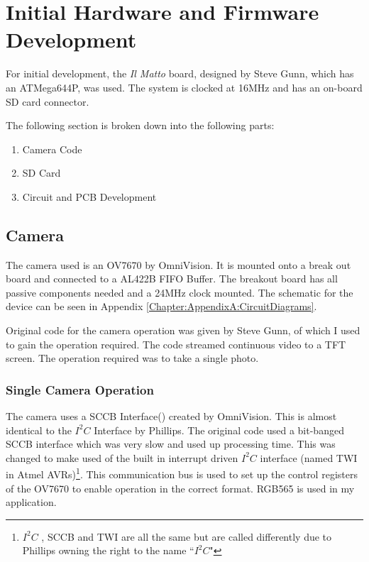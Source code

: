 \chapter{Initial Hardware and Firmware Development} \label{Chapter:HardwareDevelopment}
For initial development, the \textit{Il Matto} board, designed by Steve Gunn, which has an ATMega644P, was used. The system is clocked at 16MHz and has an on-board SD card connector. 

The following section is broken down into the following parts:
\begin{enumerate}
\item Camera Code
\item SD Card
\item Circuit and PCB Development
\end{enumerate}

\section{Camera} \label{Section:Camera}

The camera used is an OV7670 by OmniVision. It is mounted onto a break out board and connected to a AL422B FIFO Buffer. The breakout board has all passive components needed and a 24MHz clock mounted. The schematic for the device can be seen in Appendix \ref{Chapter:AppendixA:CircuitDiagrams}.

Original code for the camera operation was given by Steve Gunn, of which I used to gain the operation required. The code streamed continuous video to a TFT screen. The operation required was to take a single photo. 

\subsection{Single Camera Operation}

The camera uses a SCCB Interface(\cite{SCCB_Interface}) created by OmniVision. This is almost identical to the $I^{2}C$ Interface by Phillips. The original code used a bit-banged SCCB interface which was very slow and used up processing time. This was changed to make used of the built in interrupt driven $I^{2}C$ interface (named TWI in Atmel AVRs)\footnote{$I^{2}C$ , SCCB and TWI are all the same but are called differently due to Phillips owning the right to the name ``$I^{2}C$"}. This communication bus is used to set up the control registers of the OV7670 to enable operation in the correct format. RGB565 is used in my application.


